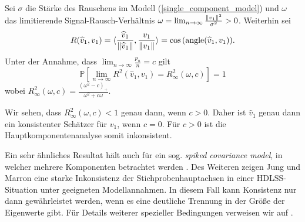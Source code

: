 \begin{thm}
\label{pca_inconsistency_ratio}
Sei $\sigma$ die Stärke des Rauschens im Modell (\ref{single_component_model}) und $\omega$ das limitierende Signal-Rausch-Verhältnis $\omega = \lim_{n \rightarrow \infty} \frac{\left\lVert v_1 \right\rVert^{2}}{\sigma^2} > 0$. Weiterhin sei 
$$R(\widehat{v}_1, v_1) = \langle \frac{\widehat{v}_1}{\left\lVert \widehat{v}_1 \right\rVert}, \frac{v_1}{\left\lVert v_1 \right\rVert} \rangle = \cos{(\operatorname{angle}(\widehat{v}_1, v_1))}.$$
Unter der Annahme, dass $\lim_{n \rightarrow \infty} \frac{p_n}{n} = c$ gilt
$$\mathbb{P}\left[\lim_{n \rightarrow \infty} R^2(\widehat{v}_1, v_1) = R_{\infty}^2(\omega, c)\right] = 1$$
wobei $R_{\infty}^2(\omega, c) = \frac{(\omega^2 - c)_+}{\omega^2 + c\omega}$.
\end{thm}

Wir sehen, dass $R_{\infty}^2(\omega, c) < 1$ genau dann, wenn $c > 0$. Daher ist $\widehat{v}_1$ genau dann ein konsistenter Schätzer für $v_1$, wenn $c = 0$. Für $c > 0$ ist die Hauptkomponentenanalyse somit inkonsistent. 

Ein sehr ähnliches Resultat hält auch für ein sog. \textit{spiked covariance model}, in welcher mehrere Komponenten betrachtet werden \cite{paul}. Des Weiteren zeigen Jung und Marron eine starke Inkonsistenz der Stichprobenhauptachsen in einer HDLSS-Situation unter geeigneten Modellannahmen. In diesem Fall kann Konsistenz nur dann gewährleistet werden, wenn es eine deutliche Trennung in der Größe der Eigenwerte gibt. Für Details weiterer spezieller Bedingungen verweisen wir auf \cite{jung}.

